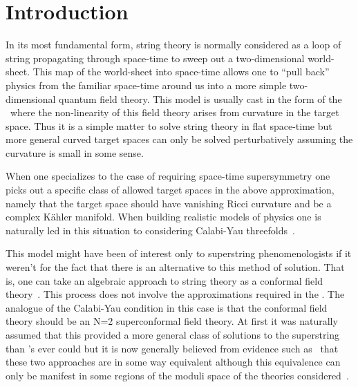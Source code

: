 \begin{abstract}
  We analyze the quantum field theory corresponding to a string
propagating on a \CY\ threefold. This theory naturally leads to the
consideration of Witten's topological non-linear $\sigma$-model and
the structure of rational curves on the \CY\ manifold. We study in
detail the case of the world-sheet of the string being mapped to a
multiple cover of an isolated rational curve and we show that a
natural compactification of the moduli space of such a multiple cover
leads to a formula in agreement with a conjecture by Candelas,
de la Ossa, Green and Parkes.
\end{abstract}

\section{Introduction}

In its most fundamental form, string theory is normally considered as
a loop of string propagating through space-time to sweep out a
two-dimensional world-sheet. This map of the world-sheet into
space-time allows one to ``pull back'' physics from the familiar
space-time around us into a more simple two-dimensional quantum field
theory. This model is usually cast in the form of the \nlsm\ where
the non-linearity of this field theory arises
from curvature in the target space. Thus it is a simple matter to
solve string theory in flat space-time but more general curved target
spaces can only be solved perturbatively assuming the curvature is
small in some sense.

When one specializes to the case of requiring space-time supersymmetry
one picks out a specific class of allowed target spaces in the above
approximation, namely that the target space should have vanishing
Ricci curvature and be a complex K\"ahler manifold. When building
realistic models of physics one is naturally led in this situation to
considering Calabi-Yau threefolds~\cite{CHSW:,Cal:sm}.

This model might have been of interest only to superstring
phenomenologists if it weren't for the fact that there is an
alternative to this method of solution. That is, one can take an
algebraic approach to string theory as a conformal field
theory~\cite{BPZ:,FMS:}. This process does not involve the
approximations required in the \nlsm.
The analogue of the Calabi-Yau condition in
this case is that the conformal field theory should be an N=2
superconformal field theory. At first it was naturally assumed that
this provided a more general class of solutions to the superstring
than \CY's ever could but it is now generally believed from evidence
such as~\cite{Gep:} that these two approaches are in some way
equivalent although this equivalence can only be manifest in some
regions of the moduli space of the theories considered~\cite{AL:qag}.

